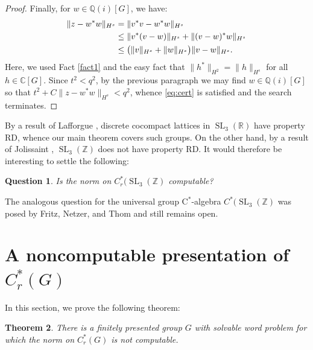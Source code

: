 \documentclass[10pt,a4paper]{amsart}
\newcommand{\Q}{\mathbb{Q}}
\newcommand{\cstar}{$\mathrm{C}^*$}
\newcommand{\Qi}{\Q(i)}
\theoremstyle{plain}
\newtheorem{theorem}{Theorem}[section]
\newtheorem{question}[theorem]{Question}
\theoremstyle{definition}
\numberwithin{equation}{section}
\begin{document}
\begin{proof}
Finally, for $w\in \Qi[G]$, we have:
\begin{alignat}{2}
\|z-w^*w\|_{H^s}&=\|v^*v-w^*w\|_{H^s} \notag \\ \notag
    &\le\|v^*(v-w)\|_{H^s}+\|(v-w)^*w\|_{H^s}\\ \notag
&\le \big(\|v\|_{H^{s}}+\|w\|_{H^{s}}\big)\|v-w\|_{H^{s}}.\notag
\end{alignat}
Here, we used Fact \ref{fact1} and the easy fact that $\|h^*\|_{H^2}=\|h\|_{H^s}$ for all $h\in \mathbb{C}[G]$.  Since $t^2<q^2$, by the previous paragraph we may find $w\in \Qi[G]$ so that $t^2+C\|z-w^*w\|_{H^s}<q^2$, whence \eqref{eq:cert} is satisfied and the search terminates.
\end{proof}


By a result of Lafforgue \cite{lafforgue}, discrete cocompact lattices in $\operatorname{SL}_3(\mathbb{R})$ have property RD, whence our main theorem covers such groups.  On the other hand, by a result of Jolissaint \cite[Theorem B]{jolissaint}, $\operatorname{SL}_3(\mathbb{Z})$ does not have property RD.  It would therefore be interesting to settle the following:

\begin{question}
Is the norm on $C^*_r(\operatorname{SL}_3(\mathbb{Z})$ computable?
\end{question}

The analogous question for the universal group \cstar-algebra $C^*(\operatorname{SL}_3(\mathbb{Z})$ was posed by Fritz, Netzer, and Thom \cite[Question 2.6]{canyou} and still remains open.

\section{A noncomputable presentation of $C^*_r(G)$}

In this section, we prove the following theorem:

\begin{theorem}
There is a finitely presented group $G$ with solvable word problem for which the norm on $C^*_r(G)$ is not computable.
\end{theorem}
\end{document}
